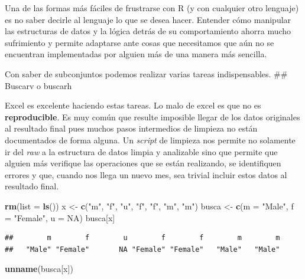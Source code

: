 \documentclass[]{article}
\newenvironment{Shaded}{\begin{snugshade}}{\end{snugshade}}
\newcommand{\KeywordTok}[1]{\textcolor[rgb]{0.13,0.29,0.53}{\textbf{{#1}}}}
\newcommand{\DataTypeTok}[1]{\textcolor[rgb]{0.13,0.29,0.53}{{#1}}}
\newcommand{\StringTok}[1]{\textcolor[rgb]{0.31,0.60,0.02}{{#1}}}
\newcommand{\OtherTok}[1]{\textcolor[rgb]{0.56,0.35,0.01}{{#1}}}
\newcommand{\NormalTok}[1]{{#1}}
\begin{document}
Una de las formas más fáciles de frustrarse con R (y con cualquier otro
lenguaje) es no saber decirle al lenguaje lo que se desea hacer.
Entender cómo manipular las estructuras de datos y la lógica detrás de
su comportamiento ahorra mucho sufrimiento y permite adaptarse ante
cosas que necesitamos que aún no se encuentran implementadas por alguien
más de una manera más sencilla.

Con saber de subconjuntos podemos realizar varias tareas indispensables.
\#\# Buscarv o buscarh

Excel es excelente haciendo estas tareas. Lo malo de excel es que no es
\textbf{reproducible}. Es muy común que resulte imposible llegar de los
datos originales al resultado final pues muchos pasos intermedios de
limpieza no están documentados de forma alguna. Un \emph{script} de
limpieza nos permite no solamente ir del \emph{raw} a la estructura de
datos limpia y analizable sino que permite que alguien más verifique las
operaciones que se están realizando, se identifiquen errores y que,
cuando nos llega un nuevo mes, sea trivial incluir estos datos al
resultado final.

\begin{Shaded}
\begin{Highlighting}[]
\KeywordTok{rm}\NormalTok{(}\DataTypeTok{list =} \KeywordTok{ls}\NormalTok{())}
\NormalTok{x <-}\StringTok{ }\KeywordTok{c}\NormalTok{(}\StringTok{"m"}\NormalTok{, }\StringTok{"f"}\NormalTok{, }\StringTok{"u"}\NormalTok{, }\StringTok{"f"}\NormalTok{, }\StringTok{"f"}\NormalTok{, }\StringTok{"m"}\NormalTok{, }\StringTok{"m"}\NormalTok{)}
\NormalTok{busca <-}\StringTok{ }\KeywordTok{c}\NormalTok{(}\DataTypeTok{m =} \StringTok{"Male"}\NormalTok{, }\DataTypeTok{f =} \StringTok{"Female"}\NormalTok{, }\DataTypeTok{u =} \OtherTok{NA}\NormalTok{)}
\NormalTok{busca[x]}
\end{Highlighting}
\end{Shaded}

\begin{verbatim}
##        m        f        u        f        f        m        m 
##   "Male" "Female"       NA "Female" "Female"   "Male"   "Male"
\end{verbatim}

\begin{Shaded}
\begin{Highlighting}[]
\KeywordTok{unname}\NormalTok{(busca[x])}
\end{Highlighting}
\end{Shaded}
\end{document}
